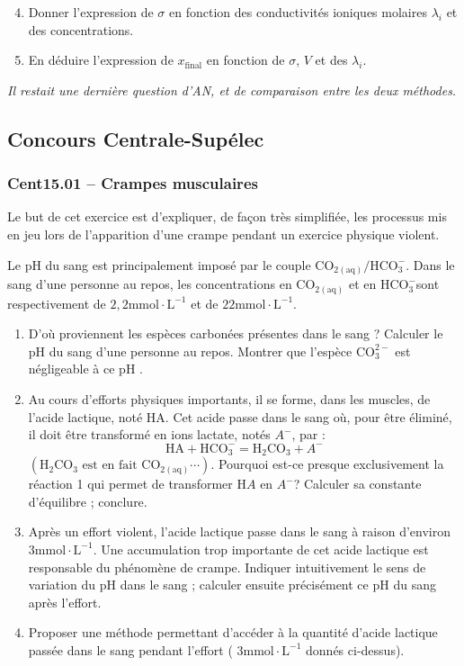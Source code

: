\begin{enumerate}
    \setcounter{enumi}{3}
    \item Donner l'expression de $\sigma$ en fonction des conductivités ioniques molaires $\lambda_i$ et des concentrations.
    \item En déduire l'expression de $x_{\text{final}}$ en fonction de $\sigma$, $V$ et des $\lambda_i$.
\end{enumerate}

\textit{Il restait une dernière question d’AN, et de comparaison entre les deux méthodes.}

\newpage
\subsection*{Concours Centrale-Supélec}
\subsubsection*{Cent15.01 -- Crampes musculaires  \lesdeux}

Le but de cet exercice est d'expliquer, de façon très simplifiée, les processus mis en jeu lors de l'apparition d'une crampe pendant un exercice physique violent.

Le pH du sang est principalement imposé par le couple $\mathrm{CO}_{2(\mathrm{aq})} / \mathrm{HCO}_3^{-}$.
Dans le sang d'une personne au repos, les concentrations en $\mathrm{CO}_{2(\mathrm{aq})}$ et en $\mathrm{HCO}_3^{-}$sont respectivement de $2,2 \mathrm{mmol} \cdot \mathrm{L}^{-1}$ et de $22 \mathrm{mmol} \cdot \mathrm{L}^{-1}$.

\begin{enumerate}
\item D'où proviennent les espèces carbonées présentes dans le sang ? Calculer le pH du sang d'une personne au repos. Montrer que l'espèce $\mathrm{CO}_3^{2-}$ est négligeable à ce pH .
\item Au cours d'efforts physiques importants, il se forme, dans les muscles, de l'acide lactique, noté HA. Cet acide passe dans le sang où, pour être éliminé, il doit être transformé en ions lactate, notés $A^{-}$, par :
$$
\mathrm{HA}+\mathrm{HCO}_3^{-}=\mathrm{H}_2 \mathrm{CO}_3+A^{-}
$$
$
\left(\mathrm{H}_2 \mathrm{CO}_3 \text { est en fait } \mathrm{CO}_{2(\mathrm{aq})} \cdots\right)
$. Pourquoi est-ce presque exclusivement la réaction 1 qui permet de transformer $\mathrm{H} A$ en $A^{-}$? Calculer sa constante d'équilibre ; conclure.
\item Après un effort violent, l'acide lactique passe dans le sang à raison d'environ $3 \mathrm{mmol} \cdot \mathrm{L}^{-1}$. Une accumulation trop importante de cet acide lactique est responsable du phénomène de crampe. Indiquer intuitivement le sens de variation du pH dans le sang ; calculer ensuite précisément ce pH du sang après l'effort.
\item Proposer une méthode permettant d'accéder à la quantité d'acide lactique passée dans le sang pendant l'effort ( $3 \mathrm{mmol} \cdot \mathrm{L}^{-1}$ donnés ci-dessus).
\end{enumerate}

